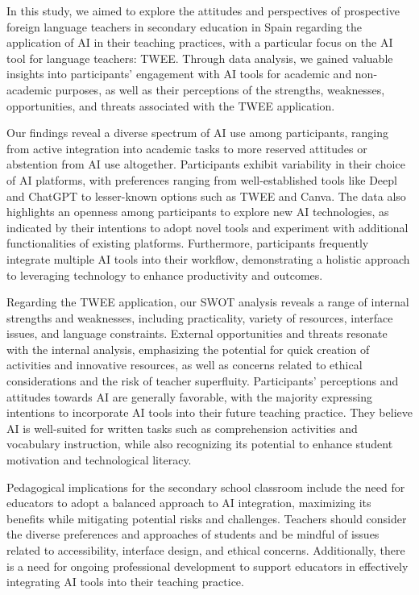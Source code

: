 In this study, we aimed to explore the attitudes and perspectives of
prospective foreign language teachers in secondary education in Spain
regarding the application of AI in their teaching practices, with a
particular focus on the AI tool for language teachers: TWEE. Through
data analysis, we gained valuable insights into
participants' engagement with AI tools for academic and
non-academic purposes, as well as their perceptions of the strengths,
weaknesses, opportunities, and threats associated with the TWEE
application.

Our findings reveal a diverse spectrum of AI use among participants,
ranging from active integration into academic tasks to more reserved
attitudes or abstention from AI use altogether. Participants exhibit
variability in their choice of AI platforms, with preferences ranging
from well-established tools like Deepl and ChatGPT to lesser-known
options such as TWEE and Canva. The data also highlights an openness
among participants to explore new AI technologies, as indicated by their
intentions to adopt novel tools and experiment with additional
functionalities of existing platforms. Furthermore, participants
frequently integrate multiple AI tools into their workflow,
demonstrating a holistic approach to leveraging technology to enhance
productivity and outcomes.

Regarding the TWEE application, our SWOT analysis reveals a range of
internal strengths and weaknesses, including practicality, variety of
resources, interface issues, and language constraints. External
opportunities and threats resonate with the internal analysis,
emphasizing the potential for quick creation of activities and
innovative resources, as well as concerns related to ethical
considerations and the risk of teacher superfluity.
Participants' perceptions and attitudes towards AI are
generally favorable, with the majority expressing intentions to
incorporate AI tools into their future teaching practice. They believe
AI is well-suited for written tasks such as comprehension activities and
vocabulary instruction, while also recognizing its potential to enhance
student motivation and technological literacy.

Pedagogical implications for the secondary school classroom include the
need for educators to adopt a balanced approach to AI integration,
maximizing its benefits while mitigating potential risks and challenges.
Teachers should consider the diverse preferences and approaches of
students and be mindful of issues related to accessibility, interface
design, and ethical concerns. Additionally, there is a need for ongoing
professional development to support educators in effectively integrating
AI tools into their teaching practice.

